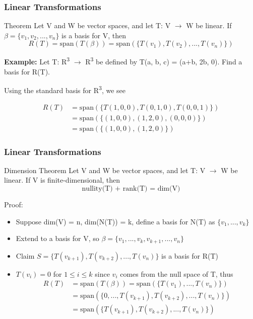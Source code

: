 \documentclass[11pt]{beamer}
\begin{document}
\begin{frame}
	\frametitle{Linear Transformations}
	\begin{block}{Theorem}
		Let V and W be vector spaces, and let T: V $\rightarrow$ W be linear. If $\beta = \{v_{1}, v_{2}, ..., v_{n}\}$ is a basis for V, then
		\[ R(T) = \text{span}(T(\beta)) = \text{span}(\{T(v_{1}), T(v_{2}), ..., T(v_{n})\}) \]
	\end{block}

\textbf{Example:} Let T: R\textsuperscript{3} $\rightarrow$ R\textsuperscript{3} be defined by T(a, b, c) = (a+b, 2b, 0). Find a basis for R(T). \\

\phantom{}

Using the standard basis for R\textsuperscript{3}, we see

	\begin{align*}
		R(T) &= \text{span}(\{ T(1,0,0), T(0,1,0), T(0,0,1) \}) \\
			&= \text{span}(\{(1,0,0), (1,2,0), (0,0,0) \}) \\
			&= \text{span}(\{(1,0,0), (1,2,0) \})
	\end{align*}
\end{frame}

\begin{frame}
	\frametitle{Linear Transformations}
	\begin{block}{Dimension Theorem}
		Let V and W be vector spaces, and let T: V $\rightarrow$ W be linear. If V is \alert{finite-dimensional}, then
		\[\text{nullity(T) + rank(T) = dim(V)} \]
	\end{block}

Proof:
\begin{itemize}
	[default]
	\item Suppose dim(V) = n, dim(N(T)) = k, define a basis for N(T) as $\{v_{1}, ..., v_{k}\}$
	\item Extend to a basis for V, so $\beta = \{v_{1}, ..., v_{k}, v_{k+1}, ..., v_{n} \}$ 
	\item Claim $S = \{T(v_{k+1}),  T(v_{k+2}), ..., T(v_{n})\}$ is a basis for R(T)
	\item $T(v_{i}) = 0$ for $1 \leq i \leq k$ since $v_{i}$ comes from the null space of T, thus
		\begin{align*}
			R(T) &= \text{span}(T(\beta)) = \text{span}(\{T(v_{1}), ..., T(v_{n})\}) \\
			&= \text{span}( \{ 0, ..., T(v_{k+1}), T(v_{k+2}), ..., T(v_{n}) \} ) \\
			&= \text{span}( 
			\{ T(v_{k+1}), T(v_{k+2}), ... , T(v_{n}) \} )
		\end{align*}
\end{itemize}
\end{frame}
\end{document}
